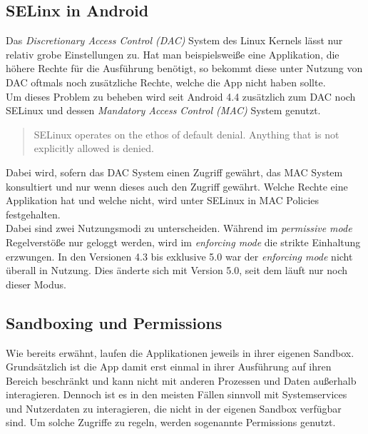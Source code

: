 	\subsection{SELinx in Android}
	Das \textit{Discretionary Access Control (DAC)} System des Linux Kernels lässt nur relativ grobe Einstellungen zu. Hat man beispielsweiße eine Applikation, die höhere Rechte für die Ausführung benötigt, so bekommt diese unter Nutzung von DAC oftmals noch zusätzliche Rechte, welche die App nicht haben sollte.\\
	Um dieses Problem zu beheben wird seit Android 4.4 zusätzlich zum DAC noch SELinux und dessen \textit{Mandatory Access Control (MAC)} System genutzt.\\	
	\begin{quote}
	SELinux operates on the ethos of default denial. Anything that is not explicitly allowed is denied.\cite{SELinuxAndroid}
	\end{quote}
\begin{flushleft}
	Dabei wird, sofern das DAC System einen Zugriff gewährt, das MAC System konsultiert und nur wenn dieses auch den Zugriff gewährt. Welche Rechte eine Applikation hat und welche nicht, wird unter SELinux in MAC Policies festgehalten.\\
	
	Dabei sind zwei Nutzungsmodi zu unterscheiden. Während im \textit{permissive mode} Regelverstöße nur geloggt werden, wird im \textit{enforcing mode} die strikte Einhaltung erzwungen. In den Versionen 4.3 bis exklusive 5.0 war der \textit{enforcing mode} nicht überall in Nutzung. Dies änderte sich mit Version 5.0, seit dem läuft nur noch dieser Modus.
\end{flushleft}
	
	\subsection{Sandboxing und Permissions} \label{sec:SandBoxingNPermissions}
	Wie bereits erwähnt, laufen die Applikationen jeweils in ihrer eigenen Sandbox. Grundsätzlich ist die App damit erst einmal in ihrer Ausführung auf ihren Bereich beschränkt und kann nicht mit anderen Prozessen und Daten außerhalb interagieren. Dennoch ist es in den meisten Fällen sinnvoll mit Systemservices und Nutzerdaten zu interagieren, die nicht in der eigenen Sandbox verfügbar sind. Um solche Zugriffe zu regeln, werden sogenannte Permissions genutzt.
	
